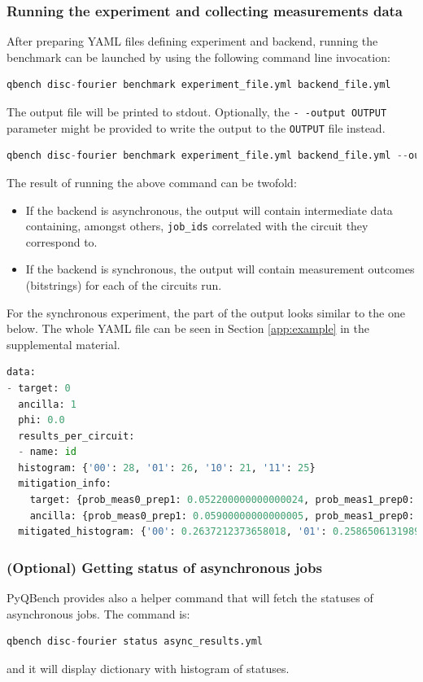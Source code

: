 \documentclass[preprint,12pt, a4paper, dvipsnames]{elsarticle}
\newcommand{\1}{{\rm 1\hspace{-0.9mm}l}}
\theoremstyle{definition}
\begin{document}
\subsubsection{Running the experiment and collecting measurements data}
After preparing YAML files defining experiment and backend,
running the benchmark can be launched by using the following command line invocation:
\begin{lstlisting}[language=Python]
qbench disc-fourier benchmark experiment_file.yml backend_file.yml
\end{lstlisting}
The output file will be printed to stdout. Optionally, the \texttt{- -output OUTPUT} parameter might
be provided to write the output to the \texttt{OUTPUT} file instead.
\begin{lstlisting}[language=Python]
qbench disc-fourier benchmark experiment_file.yml backend_file.yml --output async_results.yml
\end{lstlisting}
The result of running the above command can be twofold:
\begin{itemize}
	\item If the backend is asynchronous, the output will contain intermediate data containing, amongst
		others, \texttt{job\_ids} correlated with the circuit they correspond to.
	\item If the backend is synchronous, the output will contain measurement outcomes (bitstrings)
		for each of the circuits run.
\end{itemize}

For the synchronous experiment, the part of the output looks similar to the one below. The whole YAML
file can be seen in Section \ref{app:example} in the supplemental material.
\begin{lstlisting}[language=Python]
data:
- target: 0
  ancilla: 1
  phi: 0.0
  results_per_circuit:
  - name: id
  histogram: {'00': 28, '01': 26, '10': 21, '11': 25}
  mitigation_info:
	target: {prob_meas0_prep1: 0.052200000000000024, prob_meas1_prep0: 0.0172}
	ancilla: {prob_meas0_prep1: 0.05900000000000005, prob_meas1_prep0: 0.0202}
  mitigated_histogram: {'00': 0.2637212373658018, '01': 0.25865061319892463, '10': 0.2067279352110304, '11': 0.2709002142242433}
\end{lstlisting}

\subsubsection{(Optional) Getting status of asynchronous jobs}
 PyQBench provides also a helper command that will fetch the statuses of asynchronous jobs. The command is:
\begin{lstlisting}[language=Python]
qbench disc-fourier status async_results.yml
\end{lstlisting}
and it will display dictionary with histogram of statuses.
\end{document}
